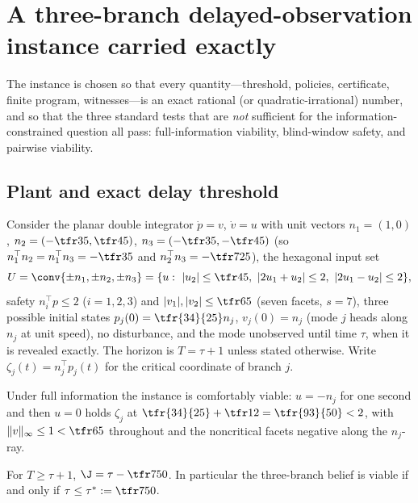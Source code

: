 \section{A three-branch delayed-observation instance carried exactly}\label{sec:instance}

The instance is chosen so that every quantity---threshold, policies, certificate, finite program, witnesses---is an exact rational (or quadratic-irrational) number, and so that the three standard tests that are \emph{not} sufficient for the information-constrained question all pass: full-information viability, blind-window safety, and pairwise viability.

\subsection{Plant and exact delay threshold}

Consider the planar double integrator $\dot p=v$, $\dot v=u$ with unit vectors $n_1=(1,0)$, $n_2=(-\tfr35,\tfr45)$, $n_3=(-\tfr35,-\tfr45)$ (so $n_1^\top n_2=n_1^\top n_3=-\tfr35$ and $n_2^\top n_3=-\tfr7{25}$), the hexagonal input set
\[
U=\conv\{\pm n_1,\pm n_2,\pm n_3\}=\{u:\ |u_2|\le\tfr45,\ |2u_1+u_2|\le2,\ |2u_1-u_2|\le2\},
\]
safety $n_i^\top p\le2$ ($i=1,2,3$) and $|v_1|,|v_2|\le\tfr65$ (seven facets, $s=7$), three possible initial states $p_j(0)=\tfr{34}{25}n_j$, $v_j(0)=n_j$ (mode $j$ heads along $n_j$ at unit speed), no disturbance, and the mode unobserved until time $\tau$, when it is revealed exactly. The horizon is $T=\tau+1$ unless stated otherwise. Write $\zeta_j(t)=n_j^\top p_j(t)$ for the critical coordinate of branch $j$.

Under full information the instance is comfortably viable: $u=-n_j$ for one second and then $u=0$ holds $\zeta_j$ at $\tfr{34}{25}+\tfr12=\tfr{93}{50}<2$, with $\|v\|_\infty\le1<\tfr65$ throughout and the noncritical facets negative along the $n_j$-ray.

\begin{proposition}\label{prop:triple}
For $T\ge\tau+1$, $\J=\tau-\tfr7{50}$. In particular the three-branch belief is viable if and only if $\tau\le\tau^\ast:=\tfr7{50}$.
\end{proposition}

